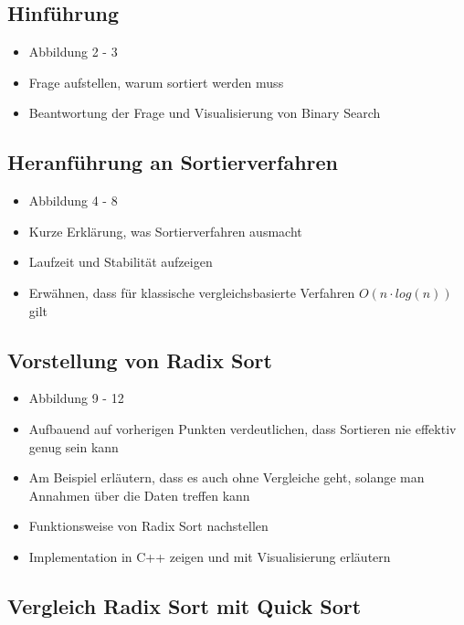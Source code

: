 \documentclass[a4paper, 12pt, oneside]{article}
\begin{document}
    \subsection{Hinführung}

    \begin{itemize}
        \item Abbildung 2 - 3
        \item Frage aufstellen, warum sortiert werden muss
        \item Beantwortung der Frage und Visualisierung von Binary Search
    \end{itemize}

    \subsection{Heranführung an Sortierverfahren}

    \begin{itemize}
        \item Abbildung 4 - 8
        \item Kurze Erklärung, was Sortierverfahren ausmacht
        \item Laufzeit und Stabilität aufzeigen
        \item Erwähnen, dass für klassische vergleichsbasierte Verfahren $O(n \cdot log(n))$ gilt
    \end{itemize}

    \subsection{Vorstellung von Radix Sort}

    \begin{itemize}
        \item Abbildung 9 - 12
        \item Aufbauend auf vorherigen Punkten verdeutlichen, dass Sortieren nie effektiv genug sein kann
        \item Am Beispiel erläutern, dass es auch ohne Vergleiche geht, solange man Annahmen über die Daten treffen kann
        \item Funktionsweise von Radix Sort nachstellen
        \item Implementation in C++ zeigen und mit Visualisierung erläutern 
    \end{itemize}

    \subsection{Vergleich Radix Sort mit Quick Sort}
\end{document}
